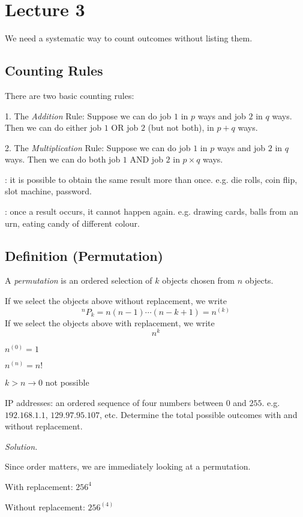 \section{Lecture 3}

\textbf{}


We need a systematic way to count outcomes without listing them.

\begin{defbox}
    \subsection{Counting Rules}
    There are two basic counting rules:

    1. The \emph{Addition} Rule:
    Suppose we can do job $1$ in $p$ ways and job $2$ in $q$ ways.
    Then we can do either job $1$ OR job $2$ (but not both), in $p + q$ ways.
    
    2. The \emph{Multiplication} Rule:
    Suppose we can do job $1$ in $p$ ways and job $2$ in $q$ ways.
    Then we can do both job $1$ AND job $2$ in $p \times q$ ways.
\end{defbox}


: it is possible to obtain
the same result more than once. e.g. die rolls, coin flip, slot machine, password.

: once a result occurs, it cannot happen again.
e.g. drawing cards, balls from an urn, eating candy of different colour.

\begin{defbox}
    \subsection{Definition (Permutation)}
    A \emph{permutation} is an ordered selection of $ k $
    objects chosen from $ n $ objects.

    If we select the objects above without replacement, we write
    \[ ^nP_k =n(n-1)\cdots(n-k+1)=n^{(k)} \]
    If we select the objects above with replacement, we write
    \[ n^k \]
\end{defbox}
$ n^{(0)}=1 $

$ n^{(n)}=n! $

$ k>n\rightarrow 0 $ not possible


IP addresses: an ordered sequence of four numbers between $ 0 $ and $ 255 $.
e.g. $ 192.168.1.1 $, $ 129.97.95.107 $, etc. Determine the
total possible outcomes with and without replacement.

\emph{Solution.}

Since order matters, we are immediately looking at a permutation.

With replacement: $ 256^4 $

Without replacement: $ 256^{(4)} $